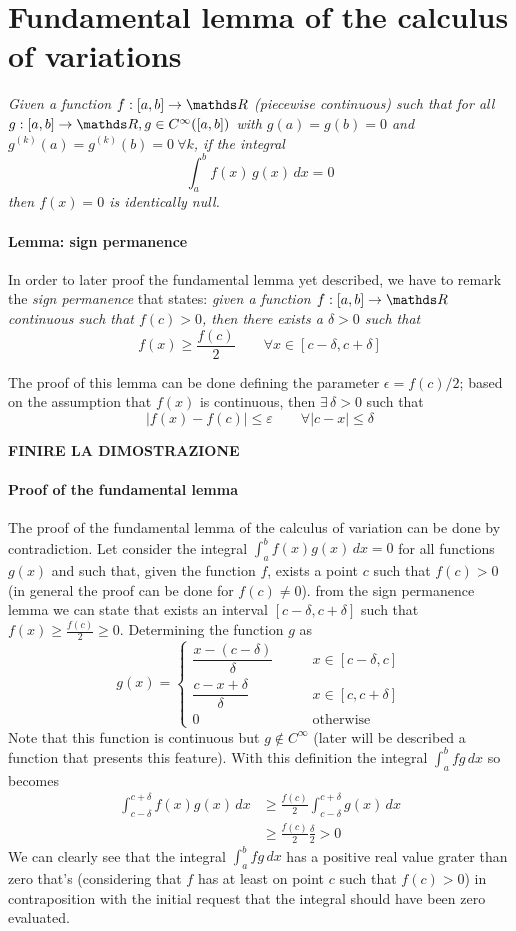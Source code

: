 \section{Fundamental lemma of the calculus of variations}
	{\itshape Given a function $f:[a,b]\rightarrow \R$ (piecewise continuous) such that for all $g:[a,b] \rightarrow \R, g \in C^\infty([a,b])$ with $g(a) = g(b) = 0$ and $g^{(k)}(a) = g^{(k)}(b) = 0 \ \forall k$, if the integral 
	\[ \int_a^b f(x)\,g(x) \, dx = 0 \]
	then $f(x)= 0 $ is identically null. }

	\paragraph{Lemma: sign permanence} In order to later proof the fundamental lemma yet described, we have to remark the \textit{sign permanence} that states: {\itshape given a function $f:[a,b]\rightarrow \R$ continuous such that $f(c) >0$, then there exists a $\delta >0$ such that }
	\[ f(x) \geq \frac{f(c)}{2} \qquad \forall x \in [c-\delta,c+\delta] \]
	
	The proof of this lemma can be done defining the parameter $\epsilon = f(c) / 2$; based on the assumption that $f(x)$ is continuous, then $\exists\, \delta >0$ such that 
	\[ |f(x) - f(c)| \leq \varepsilon \qquad \forall |c-x|\leq \delta \]
	
	\textbf{FINIRE LA DIMOSTRAZIONE}
	
	\paragraph{Proof of the fundamental lemma} The proof of the fundamental lemma of the calculus of variation can be done by contradiction. Let consider the integral $\int_a^b f(x) g(x)\, dx = 0$ for all functions $g(x)$ and such that, given the function $f$, exists a point $c$ such that $f(c) > 0$ (in general the proof can be done for $f(c)\neq 0$). from the sign permanence lemma we can state that exists an interval $[c-\delta,c+\delta]$ such that $f(x) \geq \frac{f(c)}{2 } \geq 0$. Determining the function $g$ as
	\[ g(x) = \begin{cases}
		\dfrac{x-(c-\delta)}{\delta} \qquad & x\in [c-\delta, c] \\
		\dfrac{c-x+\delta}{\delta} & x\in[c,c+\delta] \\
		0 & \textrm{otherwise}
	\end{cases} \]
	Note that this function is continuous but $g\notin C^\infty$ (later will be described a function that presents this feature). With this definition the integral $\int_a^b fg\, dx$ so becomes
	\begin{align*}
		\int_{c-\delta}^{c+\delta} f(x)g(x)\, dx & \geq \frac{f(c)}{2} \int_{c-\delta}^{c+\delta} g(x)\, dx \\
		& \geq \frac{f(c)}{2}\frac \delta 2 > 0
	\end{align*}
	We can clearly see that the integral $\int_a^b fg\, dx$ has a positive real value grater than zero that's (considering that $f$ has at least on point $c$ such that $f(c) >0$) in contraposition with the initial request that the integral should have been zero evaluated. \vspace{3mm}
	

